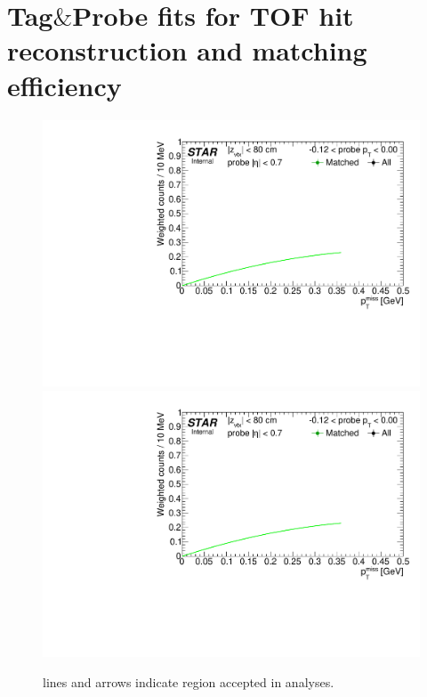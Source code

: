 
\chapter{Tag\texorpdfstring{$\&$}{&}Probe fits for TOF hit reconstruction and matching efficiency}\label{appendix:tagAndProbeTofEff}


\begin{figure}[h!]
\caption[TOF acceptance, reconstruction and matching efficiency of $\pi^{+}$.]{ lines and arrows indicate region accepted in analyses.}\label{fig:tagAndProbeTofEffFits_Pt}
\centering
\parbox{0.495\textwidth}{
  \centering
  \includegraphics[width=\linewidth,page=4]{graphics/correctionsToEff/TOF_tagAndProbe/Fitting_effVsPt_data.CPT.pdf}\\
  \includegraphics[width=\linewidth,page=5]{graphics/correctionsToEff/TOF_tagAndProbe/Fitting_effVsPt_data.CPT.pdf}\\
}
\end{figure}
